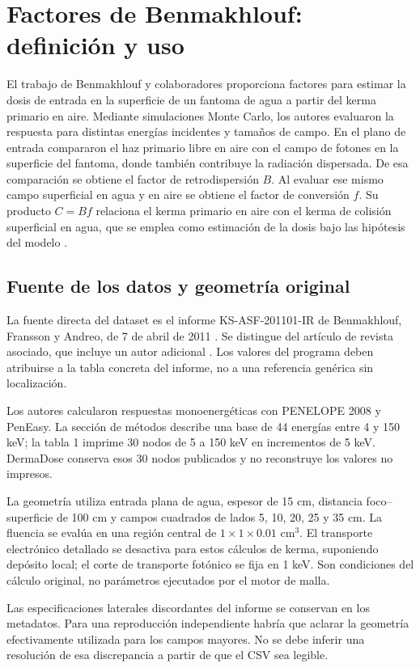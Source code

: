 \chapter{Factores de Benmakhlouf: definición y uso}

El trabajo de Benmakhlouf y colaboradores proporciona factores para estimar la dosis de entrada en la superficie de un fantoma de agua a partir del kerma primario en aire. Mediante simulaciones Monte Carlo, los autores evaluaron la respuesta para distintas energías incidentes y tamaños de campo. En el plano de entrada compararon el haz primario libre en aire con el campo de fotones en la superficie del fantoma, donde también contribuye la radiación dispersada. De esa comparación se obtiene el factor de retrodispersión $B$. Al evaluar ese mismo campo superficial en agua y en aire se obtiene el factor de conversión $f$. Su producto $C=Bf$ relaciona el kerma primario en aire con el kerma de colisión superficial en agua, que se emplea como estimación de la dosis bajo las hipótesis del modelo \citep{benreport,benarticle}.

\section{Fuente de los datos y geometría original}
La fuente directa del dataset es el informe KS-ASF-201101-IR de Benmakhlouf, Fransson y Andreo, de 7 de abril de 2011 \citep{benreport}. Se distingue del artículo de revista asociado, que incluye un autor adicional \citep{benarticle}. Los valores del programa deben atribuirse a la tabla concreta del informe, no a una referencia genérica sin localización.

Los autores calcularon respuestas monoenergéticas con PENELOPE 2008 y PenEasy. La sección de métodos describe una base de 44 energías entre 4 y 150 keV; la tabla 1 imprime 30 nodos de 5 a 150 keV en incrementos de 5 keV. DermaDose conserva esos 30 nodos publicados y no reconstruye los valores no impresos.

La geometría utiliza entrada plana de agua, espesor de 15 cm, distancia foco--superficie de 100 cm y campos cuadrados de lados 5, 10, 20, 25 y 35 cm. La fluencia se evalúa en una región central de $1\times1\times\num{0.01}$ cm$^3$. El transporte electrónico detallado se desactiva para estos cálculos de kerma, suponiendo depósito local; el corte de transporte fotónico se fija en 1 keV. Son condiciones del cálculo original, no parámetros ejecutados por el motor de malla.

Las especificaciones laterales discordantes del informe se conservan en los metadatos. Para una reproducción independiente habría que aclarar la geometría efectivamente utilizada para los campos mayores. No se debe inferir una resolución de esa discrepancia a partir de que el CSV sea legible.

